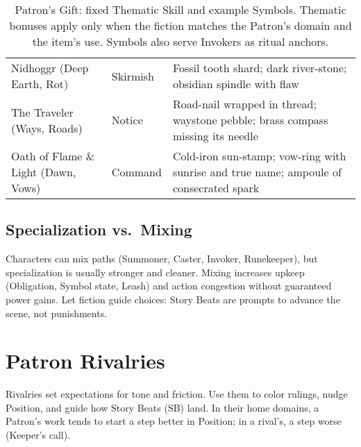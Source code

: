 \begin{table}[H]
\begin{tabular}{@{}p{3.8cm}p{3.8cm}p{7.5cm}@{}}
Nidhoggr (Deep Earth, Rot) & Skirmish & Fossil tooth shard; dark river-stone; obsidian spindle with flaw \\
The Traveler (Ways, Roads) & Notice & Road-nail wrapped in thread; waystone pebble; brass compass missing its needle \\
Oath of Flame \& Light (Dawn, Vows) & Command & Cold-iron sun-stamp; vow-ring with sunrise and true name; ampoule of consecrated spark \\
\bottomrule
\end{tabular}
\caption{Patron's Gift: fixed Thematic Skill and example Symbols. Thematic bonuses apply only when the fiction matches the Patron’s domain and the item’s use. Symbols also serve Invokers as ritual anchors.}
\label{tab:gift-thematic-map}
\end{table}

\subsection{Specialization vs.\ Mixing}
\label{subsec:mixing}
Characters can mix paths (Summoner, Caster, Invoker, Runekeeper), but specialization is usually stronger and cleaner. Mixing increases upkeep (Obligation, Symbol state, Leash) and action congestion without guaranteed power gains. Let fiction guide choices: Story Beats are prompts to advance the scene, not punishments.
















\section{Patron Rivalries}
\label{sec:patron-rivalries}

Rivalries set expectations for tone and friction. Use them to color rulings, nudge Position, and guide how Story Beats (SB) land. In their home domains, a Patron’s work tends to start a step better in Position; in a rival’s, a step worse (Keeper’s call).


